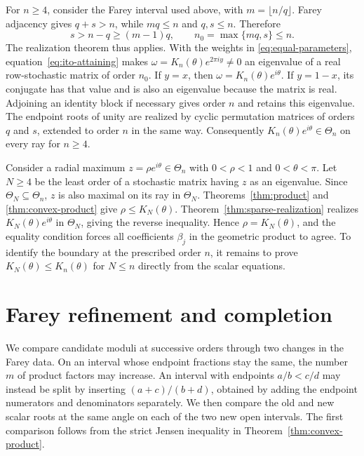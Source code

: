 \documentclass[11pt,a4paper]{article}
\theoremstyle{definition}
\theoremstyle{remark}
\numberwithin{equation}{section}
\begin{document}
For $n\ge4$, consider the Farey interval used above, with $m=\lfloor n/q\rfloor$. Farey adjacency gives $q+s>n$, while $mq\le n$ and $q,s\le n$. Therefore
\[
 s>n-q\ge(m-1)q,\qquad n_0=\max\{mq,s\}\le n.
\]
The realization theorem thus applies. With the weights in \eqref{eq:equal-parameters}, equation~\eqref{eq:ito-attaining} makes $\omega=K_n(\theta)e^{2\pi i y}\ne0$ an eigenvalue of a real row-stochastic matrix of order $n_0$. If $y=x$, then $\omega=K_n(\theta)e^{i\theta}$. If $y=1-x$, its conjugate has that value and is also an eigenvalue because the matrix is real. Adjoining an identity block if necessary gives order $n$ and retains this eigenvalue. The endpoint roots of unity are realized by cyclic permutation matrices of orders $q$ and $s$, extended to order $n$ in the same way. Consequently $K_n(\theta)e^{i\theta}\in\Theta_n$ on every ray for $n\ge4$.


Consider a radial maximum $z=\rho e^{i\theta}\in\Theta_n$ with $0<\rho<1$ and $0<\theta<\pi$. Let $N\ge4$ be the least order of a stochastic matrix having $z$ as an eigenvalue. Since $\Theta_N\subseteq\Theta_n$, $z$ is also maximal on its ray in $\Theta_N$. Theorems~\ref{thm:product} and \ref{thm:convex-product} give $\rho\le K_N(\theta)$. Theorem~\ref{thm:sparse-realization} realizes $K_N(\theta)e^{i\theta}$ in $\Theta_N$, giving the reverse inequality. Hence $\rho=K_N(\theta)$, and the equality condition forces all coefficients $\beta_j$ in the geometric product to agree. To identify the boundary at the prescribed order $n$, it remains to prove $K_N(\theta)\le K_n(\theta)$ for $N\le n$ directly from the scalar equations.

\section{Farey refinement and completion}
We compare candidate moduli at successive orders through two changes in the Farey data. On an interval whose endpoint fractions stay the same, the number $m$ of product factors may increase. An interval with endpoints $a/b<c/d$ may instead be split by inserting $(a+c)/(b+d)$, obtained by adding the endpoint numerators and denominators separately. We then compare the old and new scalar roots at the same angle on each of the two new open intervals. The first comparison follows from the strict Jensen inequality in Theorem~\ref{thm:convex-product}.
\end{document}
